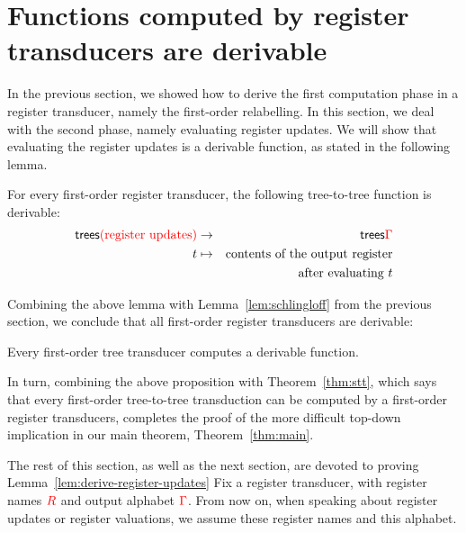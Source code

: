 
\section{Functions computed by register transducers are derivable}
\label{sec:stt-derivable}
In the previous section, we showed how to derive the first computation phase in a register transducer, namely the first-order relabelling.  In this section, we deal with the second phase, namely evaluating register updates. We will show that evaluating the  register updates is a derivable function,  as stated in the following lemma.
\begin{lemma}\label{lem:derive-register-updates}
    For every first-order register transducer, the  following tree-to-tree function  is derivable:
    \begin{eqnarray*}
    \mathsf {trees}{{\color{red}{\text{(register updates)}}}} &\to & \mathsf {trees} {\color{red}{\Gamma}} \\
    t & \mapsto & \text{contents of the output register}\\
    && \text{after evaluating $t$}
    \end{eqnarray*}    
\end{lemma}

Combining the above lemma with Lemma~\ref{lem:schlingloff} from the previous section, we conclude that all first-order register transducers are derivable:
\begin{proposition}
    \label{prop:many-register} 
Every first-order  tree transducer computes a derivable function. 
\end{proposition}
In turn, combining the above proposition with  Theorem~\ref{thm:stt}, which says that every first-order tree-to-tree transduction can be computed by a first-order register transducers,  completes the proof of the more difficult top-down implication in our main theorem, Theorem~\ref{thm:main}.  

The rest of this section, as well as the next section, are devoted to proving Lemma~\ref{lem:derive-register-updates}
Fix a register transducer, with register names ${{\color{red}{R}}}$ and output alphabet ${\color{red}{\Gamma}}$.   From now on, when speaking about register updates or register valuations, we assume these register names and this alphabet. 

